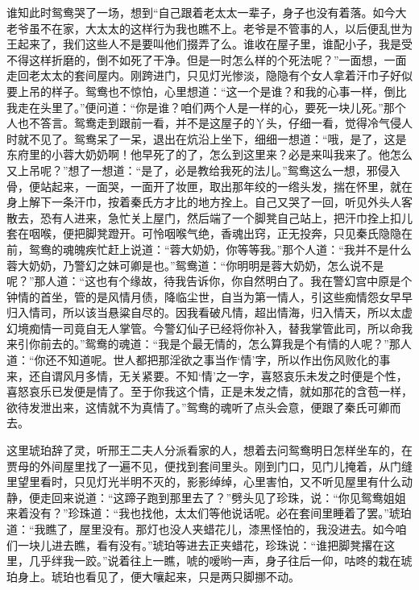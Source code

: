 \begin{parag}
    谁知此时鸳鸯哭了一场，想到“自己跟着老太太一辈子，身子也没有着落。如今大老爷虽不在家，大太太的这样行为我也瞧不上。老爷是不管事的人，以后便乱世为王起来了，我们这些人不是要叫他们掇弄了么。谁收在屋子里，谁配小子，我是受不得这样折磨的，倒不如死了干净。但是一时怎么样的个死法呢？”一面想，一面走回老太太的套间屋内。刚跨进门，只见灯光惨淡，隐隐有个女人拿着汗巾子好似要上吊的样子。鸳鸯也不惊怕，心里想道：“这一个是谁？和我的心事一样，倒比我走在头里了。”便问道：“你是谁？咱们两个人是一样的心，要死一块儿死。”那个人也不答言。鸳鸯走到跟前一看，并不是这屋子的丫头，仔细一看，觉得冷气侵人时就不见了。鸳鸯呆了一呆，退出在炕沿上坐下，细细一想道：“哦，是了，这是东府里的小蓉大奶奶啊！他早死了的了，怎么到这里来？必是来叫我来了。他怎么又上吊呢？”想了一想道：“是了，必是教给我死的法儿。”鸳鸯这么一想，邪侵入骨，便站起来，一面哭，一面开了妆匣，取出那年绞的一绺头发，揣在怀里，就在身上解下一条汗巾，按着秦氏方才比的地方拴上。自己又哭了一回，听见外头人客散去，恐有人进来，急忙关上屋门，然后端了一个脚凳自己站上，把汗巾拴上扣儿套在咽喉，便把脚凳蹬开。可怜咽喉气绝，香魂出窍，正无投奔，只见秦氏隐隐在前，鸳鸯的魂魄疾忙赶上说道：“蓉大奶奶，你等等我。”那个人道：“我并不是什么蓉大奶奶，乃警幻之妹可卿是也。”鸳鸯道：“你明明是蓉大奶奶，怎么说不是呢？”那人道：“这也有个缘故，待我告诉你，你自然明白了。我在警幻宫中原是个钟情的首坐，管的是风情月债，降临尘世，自当为第一情人，引这些痴情怨女早早归入情司，所以该当悬粱自尽的。因我看破凡情，超出情海，归入情天，所以太虚幻境痴情一司竟自无人掌管。今警幻仙子已经将你补入，替我掌管此司，所以命我来引你前去的。”鸳鸯的魂道：“我是个最无情的，怎么算我是个有情的人呢？”那人道：“你还不知道呢。世人都把那淫欲之事当作‘情’字，所以作出伤风败化的事来，还自谓风月多情，无关紧要。不知‘情’之一字，喜怒哀乐未发之时便是个性，喜怒哀乐已发便是情了。至于你我这个情，正是未发之情，就如那花的含苞一样，欲待发泄出来，这情就不为真情了。”鸳鸯的魂听了点头会意，便跟了秦氏可卿而去。
\end{parag}


\begin{parag}
    这里琥珀辞了灵，听邢王二夫人分派看家的人，想着去问鸳鸯明日怎样坐车的，在贾母的外间屋里找了一遍不见，便找到套间里头。刚到门口，见门儿掩着，从门缝里望里看时，只见灯光半明不灭的，影影绰绰，心里害怕，又不听见屋里有什么动静，便走回来说道：“这蹄子跑到那里去了？”劈头见了珍珠，说：“你见鸳鸯姐姐来着没有？”珍珠道：“我也找他，太太们等他说话呢。必在套间里睡着了罢。”琥珀道：“我瞧了，屋里没有。那灯也没人夹蜡花儿，漆黑怪怕的，我没进去。如今咱们一块儿进去瞧，看有没有。”琥珀等进去正夹蜡花，珍珠说：“谁把脚凳撂在这里，几乎绊我一跤。”说着往上一瞧，唬的嗳哟一声，身子往后一仰，咕咚的栽在琥珀身上。琥珀也看见了，便大嚷起来，只是两只脚挪不动。
\end{parag}


